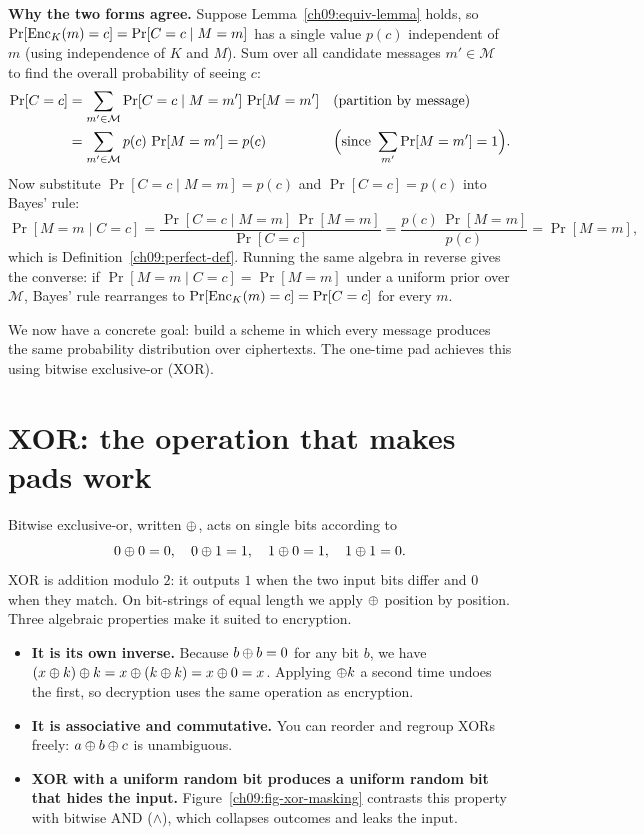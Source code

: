 \begin{whybox}
\textbf{Why the two forms agree.} Suppose Lemma~\ref{ch09:equiv-lemma} holds, so $\Pr[\operatorname{Enc}_K(m) = c] = \Pr[C = c \mid M = m]$ has a single value $p(c)$ independent of $m$ (using independence of $K$ and $M$). Sum over all candidate messages $m' \in \mathcal{M}$ to find the overall probability of seeing $c$:
\begin{align*}
  \Pr[C = c] &= \sum_{m' \in \mathcal{M}} \Pr[C = c \mid M = m']\,\Pr[M = m'] && \text{(partition by message)} \\
             &= \sum_{m' \in \mathcal{M}} p(c)\,\Pr[M = m'] = p(c) && \Bigl(\text{since } \sum_{m'} \Pr[M = m'] = 1\Bigr).
\end{align*}
Now substitute $\Pr[C = c \mid M = m] = p(c)$ and $\Pr[C = c] = p(c)$ into Bayes' rule:
\[
  \Pr[M = m \mid C = c] = \frac{\Pr[C = c \mid M = m]\,\Pr[M = m]}{\Pr[C = c]}
  = \frac{p(c)\,\Pr[M = m]}{p(c)} = \Pr[M = m],
\]
which is Definition~\ref{ch09:perfect-def}. Running the same algebra in reverse gives the converse: if $\Pr[M = m \mid C = c] = \Pr[M = m]$ under a uniform prior over $\mathcal{M}$, Bayes' rule rearranges to $\Pr[\operatorname{Enc}_K(m) = c] = \Pr[C = c]$ for every $m$.
\end{whybox}

We now have a concrete goal: build a scheme in which every message produces the same probability distribution over ciphertexts. The one-time pad achieves this using bitwise exclusive-or (XOR).

\section{XOR: the operation that makes pads work}
\label{ch09:xor}

Bitwise exclusive-or, written $\oplus$, acts on single bits according to
\[
  0 \oplus 0 = 0,\quad 0 \oplus 1 = 1,\quad 1 \oplus 0 = 1,\quad 1 \oplus 1 = 0.
\]
XOR is addition modulo $2$: it outputs $1$ when the two input bits differ and $0$ when they match. On bit-strings of equal length we apply $\oplus$ position by position. Three algebraic properties make it suited to encryption.

\begin{itemize}
  \item \textbf{It is its own inverse.} Because $b \oplus b = 0$ for any bit $b$, we have $(x \oplus k) \oplus k = x \oplus (k \oplus k) = x \oplus 0 = x$. Applying $\oplus k$ a second time undoes the first, so decryption uses the same operation as encryption.
  \item \textbf{It is associative and commutative.} You can reorder and regroup XORs freely: $a \oplus b \oplus c$ is unambiguous.
  \item \textbf{XOR with a uniform random bit produces a uniform random bit that hides the input.} Figure~\ref{ch09:fig-xor-masking} contrasts this property with bitwise AND ($\land$), which collapses outcomes and leaks the input.
\end{itemize}

